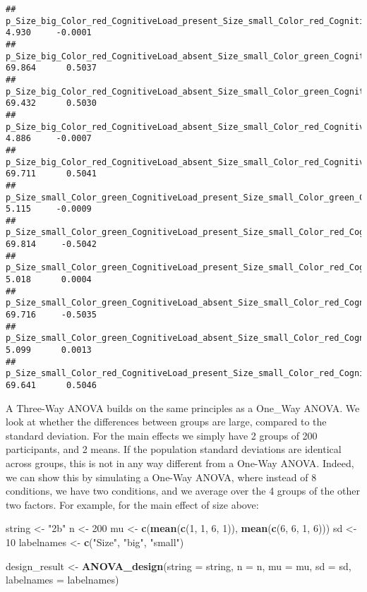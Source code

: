 \documentclass[]{article}
\newenvironment{Shaded}{\begin{snugshade}}{\end{snugshade}}
\newcommand{\KeywordTok}[1]{\textcolor[rgb]{0.13,0.29,0.53}{\textbf{#1}}}
\newcommand{\DataTypeTok}[1]{\textcolor[rgb]{0.13,0.29,0.53}{#1}}
\newcommand{\DecValTok}[1]{\textcolor[rgb]{0.00,0.00,0.81}{#1}}
\newcommand{\StringTok}[1]{\textcolor[rgb]{0.31,0.60,0.02}{#1}}
\newcommand{\NormalTok}[1]{#1}
\begin{document}
\begin{verbatim}
## p_Size_big_Color_red_CognitiveLoad_present_Size_small_Color_red_CognitiveLoad_absent        4.930     -0.0001
## p_Size_big_Color_red_CognitiveLoad_absent_Size_small_Color_green_CognitiveLoad_present     69.864      0.5037
## p_Size_big_Color_red_CognitiveLoad_absent_Size_small_Color_green_CognitiveLoad_absent      69.432      0.5030
## p_Size_big_Color_red_CognitiveLoad_absent_Size_small_Color_red_CognitiveLoad_present        4.886     -0.0007
## p_Size_big_Color_red_CognitiveLoad_absent_Size_small_Color_red_CognitiveLoad_absent        69.711      0.5041
## p_Size_small_Color_green_CognitiveLoad_present_Size_small_Color_green_CognitiveLoad_absent  5.115     -0.0009
## p_Size_small_Color_green_CognitiveLoad_present_Size_small_Color_red_CognitiveLoad_present  69.814     -0.5042
## p_Size_small_Color_green_CognitiveLoad_present_Size_small_Color_red_CognitiveLoad_absent    5.018      0.0004
## p_Size_small_Color_green_CognitiveLoad_absent_Size_small_Color_red_CognitiveLoad_present   69.716     -0.5035
## p_Size_small_Color_green_CognitiveLoad_absent_Size_small_Color_red_CognitiveLoad_absent     5.099      0.0013
## p_Size_small_Color_red_CognitiveLoad_present_Size_small_Color_red_CognitiveLoad_absent     69.641      0.5046
\end{verbatim}

A Three-Way ANOVA builds on the same principles as a One\_Way ANOVA. We
look at whether the differences between groups are large, compared to
the standard deviation. For the main effects we simply have 2 groups of
200 participants, and 2 means. If the population standard deviations are
identical across groups, this is not in any way different from a One-Way
ANOVA. Indeed, we can show this by simulating a One-Way ANOVA, where
instead of 8 conditions, we have two conditions, and we average over the
4 groups of the other two factors. For example, for the main effect of
size above:

\begin{Shaded}
\begin{Highlighting}[]
\NormalTok{string <-}\StringTok{ "2b"}
\NormalTok{n <-}\StringTok{ }\DecValTok{200}
\NormalTok{mu <-}\StringTok{ }\KeywordTok{c}\NormalTok{(}\KeywordTok{mean}\NormalTok{(}\KeywordTok{c}\NormalTok{(}\DecValTok{1}\NormalTok{, }\DecValTok{1}\NormalTok{, }\DecValTok{6}\NormalTok{, }\DecValTok{1}\NormalTok{)), }\KeywordTok{mean}\NormalTok{(}\KeywordTok{c}\NormalTok{(}\DecValTok{6}\NormalTok{, }\DecValTok{6}\NormalTok{, }\DecValTok{1}\NormalTok{, }\DecValTok{6}\NormalTok{)))}
\NormalTok{sd <-}\StringTok{ }\DecValTok{10}
\NormalTok{labelnames <-}\StringTok{ }\KeywordTok{c}\NormalTok{(}\StringTok{"Size"}\NormalTok{, }\StringTok{"big"}\NormalTok{, }\StringTok{"small"}\NormalTok{)}

\NormalTok{design_result <-}\StringTok{ }\KeywordTok{ANOVA_design}\NormalTok{(}\DataTypeTok{string =}\NormalTok{ string,}
                   \DataTypeTok{n =}\NormalTok{ n, }
                   \DataTypeTok{mu =}\NormalTok{ mu, }
                   \DataTypeTok{sd =}\NormalTok{ sd, }
                   \DataTypeTok{labelnames =}\NormalTok{ labelnames)}
\end{Highlighting}
\end{Shaded}
\end{document}
